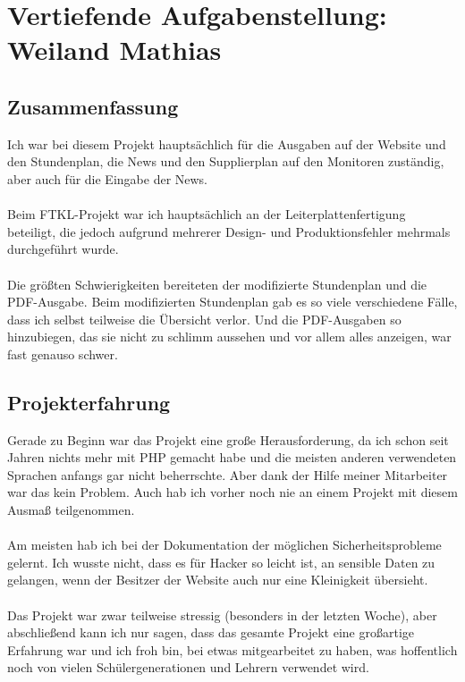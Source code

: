 \chapter[Weiland]{Vertiefende Aufgabenstellung: \\Weiland Mathias}

\section{Zusammenfassung}
Ich war bei diesem Projekt hauptsächlich für die Ausgaben auf der Website und den Stundenplan, die News und den Supplierplan auf den Monitoren zuständig, aber auch für die Eingabe der News. \\\\
Beim FTKL-Projekt war ich hauptsächlich an der Leiterplattenfertigung beteiligt, die jedoch aufgrund mehrerer Design- und Produktionsfehler mehrmals durchgeführt wurde.\\\\
Die größten Schwierigkeiten bereiteten der modifizierte Stundenplan und die PDF-Ausgabe. Beim modifizierten Stundenplan gab es so viele verschiedene Fälle, dass ich selbst teilweise die Übersicht verlor. Und die PDF-Ausgaben so hinzubiegen, das sie nicht zu schlimm aussehen und vor allem alles anzeigen, war fast genauso schwer.
\section{Projekterfahrung}
Gerade zu Beginn war das Projekt eine große Herausforderung, da ich schon seit Jahren nichts mehr mit PHP gemacht habe und die meisten anderen verwendeten Sprachen anfangs gar nicht beherrschte. Aber dank der Hilfe meiner Mitarbeiter war das kein Problem. Auch hab ich vorher noch nie an einem Projekt mit diesem Ausmaß teilgenommen.\\\\
Am meisten hab ich bei der Dokumentation der möglichen Sicherheitsprobleme gelernt. Ich wusste nicht, dass es für Hacker so leicht ist, an sensible Daten zu gelangen, wenn der Besitzer der Website auch nur eine Kleinigkeit übersieht.\\\\
Das Projekt war zwar teilweise stressig (besonders in der letzten Woche), aber abschließend kann ich nur sagen, dass das gesamte Projekt eine großartige Erfahrung war und ich froh bin, bei etwas mitgearbeitet zu haben, was hoffentlich noch von vielen Schülergenerationen und Lehrern verwendet wird.